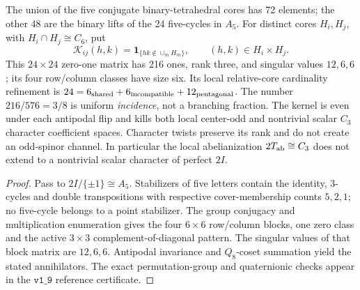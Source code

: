 \documentclass[11pt]{article}
\begin{document}
\begin{proposition}
\label{p1:prop:v366-cross-core-pentagonal-kernel}
The union of the five conjugate binary-tetrahedral cores has 72
elements; the other 48 are the binary lifts of the 24 five-cycles
in $A_5$.  For distinct cores $H_i,H_j$, with
$H_i\cap H_j\cong C_6$, put
\[
 \mathcal K_{ij}(h,k)=\mathbf1_{\{hk\notin\cup_m H_m\}},
 \qquad(h,k)\in H_i\times H_j.
\]
This $24\times24$ zero-one matrix has 216 ones, rank three,
and singular values $12,6,6$; its four row/column classes have
size six.  Its local relative-core cardinality refinement is
$24=6_{\rm shared}+6_{\rm incompatible}+12_{\rm pentagonal}$.
The number $216/576=3/8$ is uniform \emph{incidence}, not a
branching fraction.  The kernel is even under each antipodal flip
and kills both local center-odd and nontrivial scalar $C_3$
character coefficient spaces.  Character twists preserve its rank
and do not create an odd-spinor channel.  In particular the local
abelianization $2T_{\rm ab}\cong C_3$ does not extend to a nontrivial
scalar character of perfect $2I$.
\end{proposition}
\begin{proof}
Pass to $2I/\{\pm1\}\cong A_5$.  Stabilizers of five letters
contain the identity, 3-cycles and double transpositions with
respective cover-membership counts $5,2,1$; no five-cycle belongs
to a point stabilizer.  The group conjugacy and multiplication
enumeration gives the four $6\times6$ row/column blocks, one zero
class and the active $3\times3$ complement-of-diagonal pattern.
The singular values of that block matrix are $12,6,6$.
Antipodal invariance and $Q_8$-coset summation yield the stated
annihilators.  The exact permutation-group and quaternionic checks
appear in the $\texttt{v1\_9}$ reference certificate.
\end{proof}
\end{document}
